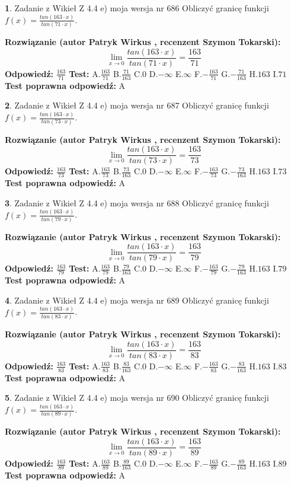 \documentclass[12pt, a4paper]{article}
\theoremstyle{definition} %
\newtheorem{zad}{}
\newcommand{\zadStart}[1]{\begin{zad}#1\newline}
\newcommand{\zadStop}{\end{zad}}
\newcommand{\rozwStart}[2]{\noindent \textbf{Rozwiązanie (autor #1 , recenzent #2): }\newline}
\newcommand{\rozwStop}{\newline}
\newcommand{\odpStart}{\noindent \textbf{Odpowiedź:}\newline}
\newcommand{\odpStop}{\newline}
\newcommand{\testStart}{\noindent \textbf{Test:}\newline}
\newcommand{\testStop}{\newline}
\newcommand{\kluczStart}{\noindent \textbf{Test poprawna odpowiedź:}\newline}
\newcommand{\kluczStop}{\newline}
\begin{document}
\zadStart{Zadanie z Wikieł Z 4.4 e) moja wersja nr 686}
Obliczyć granicę funkcji $f(x)=\frac{tan(163\cdot x)}{tan(71\cdot x)}$.
\zadStop
\rozwStart{Patryk Wirkus}{Szymon Tokarski}
$$\lim\limits_{x\to 0}\frac{tan(163\cdot x)}{tan(71\cdot x)}=
\frac{163}{71}$$
\rozwStop
\odpStart
$\frac{163}{71}$
\odpStop
\testStart
A.$\frac{163}{71}$
B.$\frac{71}{163}$
C.$0$
D.$-\infty$
E.$\infty$
F.$-\frac{163}{71}$
G.$-\frac{71}{163}$
H.$163$
I.$71$
\testStop
\kluczStart
A
\kluczStop



\zadStart{Zadanie z Wikieł Z 4.4 e) moja wersja nr 687}
Obliczyć granicę funkcji $f(x)=\frac{tan(163\cdot x)}{tan(73\cdot x)}$.
\zadStop
\rozwStart{Patryk Wirkus}{Szymon Tokarski}
$$\lim\limits_{x\to 0}\frac{tan(163\cdot x)}{tan(73\cdot x)}=
\frac{163}{73}$$
\rozwStop
\odpStart
$\frac{163}{73}$
\odpStop
\testStart
A.$\frac{163}{73}$
B.$\frac{73}{163}$
C.$0$
D.$-\infty$
E.$\infty$
F.$-\frac{163}{73}$
G.$-\frac{73}{163}$
H.$163$
I.$73$
\testStop
\kluczStart
A
\kluczStop



\zadStart{Zadanie z Wikieł Z 4.4 e) moja wersja nr 688}
Obliczyć granicę funkcji $f(x)=\frac{tan(163\cdot x)}{tan(79\cdot x)}$.
\zadStop
\rozwStart{Patryk Wirkus}{Szymon Tokarski}
$$\lim\limits_{x\to 0}\frac{tan(163\cdot x)}{tan(79\cdot x)}=
\frac{163}{79}$$
\rozwStop
\odpStart
$\frac{163}{79}$
\odpStop
\testStart
A.$\frac{163}{79}$
B.$\frac{79}{163}$
C.$0$
D.$-\infty$
E.$\infty$
F.$-\frac{163}{79}$
G.$-\frac{79}{163}$
H.$163$
I.$79$
\testStop
\kluczStart
A
\kluczStop



\zadStart{Zadanie z Wikieł Z 4.4 e) moja wersja nr 689}
Obliczyć granicę funkcji $f(x)=\frac{tan(163\cdot x)}{tan(83\cdot x)}$.
\zadStop
\rozwStart{Patryk Wirkus}{Szymon Tokarski}
$$\lim\limits_{x\to 0}\frac{tan(163\cdot x)}{tan(83\cdot x)}=
\frac{163}{83}$$
\rozwStop
\odpStart
$\frac{163}{83}$
\odpStop
\testStart
A.$\frac{163}{83}$
B.$\frac{83}{163}$
C.$0$
D.$-\infty$
E.$\infty$
F.$-\frac{163}{83}$
G.$-\frac{83}{163}$
H.$163$
I.$83$
\testStop
\kluczStart
A
\kluczStop



\zadStart{Zadanie z Wikieł Z 4.4 e) moja wersja nr 690}
Obliczyć granicę funkcji $f(x)=\frac{tan(163\cdot x)}{tan(89\cdot x)}$.
\zadStop
\rozwStart{Patryk Wirkus}{Szymon Tokarski}
$$\lim\limits_{x\to 0}\frac{tan(163\cdot x)}{tan(89\cdot x)}=
\frac{163}{89}$$
\rozwStop
\odpStart
$\frac{163}{89}$
\odpStop
\testStart
A.$\frac{163}{89}$
B.$\frac{89}{163}$
C.$0$
D.$-\infty$
E.$\infty$
F.$-\frac{163}{89}$
G.$-\frac{89}{163}$
H.$163$
I.$89$
\testStop
\kluczStart
A
\kluczStop
\end{document}
